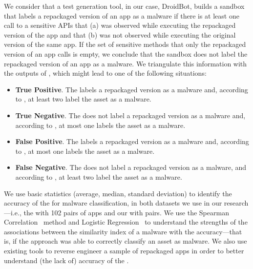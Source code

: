 We consider that a test
generation tool, in our case, DroidBot, builds a sandbox that labels a repackaged version
of an app as a malware if there is at least one call to a sensitive APIs that (a) was observed
while executing the repackaged version of the app and that (b) was not observed while
executing the original version of the same app. 
If the set of sensitive methods that only the repackaged version of an app calls is empty,
we conclude that the sandbox does not label the repackaged version of an app as a malware. We triangulate
this information with the outputs of \vt, which might lead to one of the following
situations:

\begin{itemize}
\item {\bf True Positive}. The \mas labels a repackaged version as a malware and, according to
  \vt, at least two \ses label the asset as a malware.
  
\item {\bf True Negative}. The \mas does not label a repackaged version as a malware and,
  according to \vt, at most one \se labels the asset as a malware. 

\item {\bf False Positive}. The \mas labels a repackaged version as a malware and, according to
  \vt, at most one \se labels the asset as a malware.

\item {\bf False Negative}. The \mas does not label a repackaged version as a malware, and
  according to \vt, at least two \ses label the asset as a malware.
\end{itemize}

We use basic statistics (average, median, standard deviation) to identify the
accuracy of the \mas for malware classification, in both
datasets we use in our research---i.e., the \sds
with 102 pairs of apps and our \cds with
\apps pairs. We use the Spearman Correlation~\cite{spearman-correlation} method and
Logistic Regression~\cite{statistical-learning} to understand the strengths of
the associations between the similarity index of a
malware with the \mas accuracy---that is,
if the approach was able to correctly classify an asset as malware. We also use existing tools to reverse engineer a sample of repackaged
apps in order to better understand (the lack of) accuracy
of the \mas.




